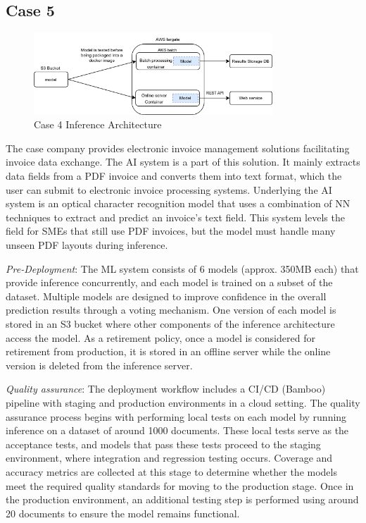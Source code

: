 \subsection*{Case 5} %
\label{case: 5} 

\begin{figure}[t]
\centering
\includegraphics[width=0.8\textwidth]{images/case4_deployment_process_v2.png}
\caption{Case 4 Inference Architecture}
\label{fig: case4_deployment_process}
\end{figure}

The case company provides electronic invoice management solutions facilitating invoice data exchange. The AI system is a part of this solution. It mainly extracts data fields from a PDF invoice and converts them into text format, which the user can submit to electronic invoice processing systems. Underlying the AI system is an optical character recognition model that uses a combination of NN techniques to extract and predict an invoice’s text field. This system levels the field for SMEs that still use PDF invoices, but the model must handle many unseen PDF layouts during inference.


\textit{Pre-Deployment}: The ML system consists of 6 models (approx. 350MB each) that provide inference concurrently, and each model is trained on a subset of the dataset. Multiple models are designed to improve confidence in the overall prediction results through a voting mechanism. One version of each model is stored in an S3 bucket where other components of the inference architecture access the model. As a retirement policy, once a model is considered for retirement from production, it is stored in an offline server while the online version is deleted from the inference server.

\textit{Quality assurance}: The deployment workflow includes a CI/CD (Bamboo) pipeline with staging and production environments in a cloud setting. The quality assurance process begins with performing local tests on each model by running inference on a dataset of around 1000 documents. These local tests serve as the acceptance tests, and models that pass these tests proceed to the staging environment, where integration and regression testing occurs. Coverage and accuracy metrics are collected at this stage to determine whether the models meet the required quality standards for moving to the production stage. Once in the production environment, an additional testing step is performed using around 20 documents to ensure the model remains functional.

